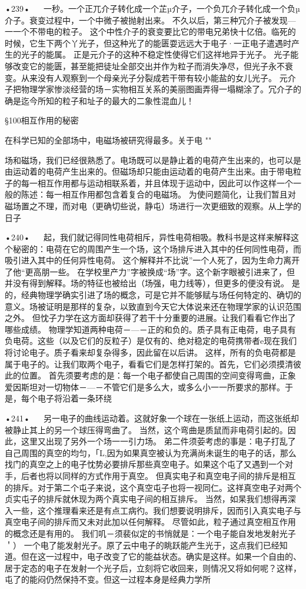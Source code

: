 •239•
  
一秒。一个正兀介子转化成一个芷µ介子，一个负兀介子转化成一个负µ介子。衰变过程中，一个中微子被抛射出来。
不久以后，第三种冗介子被发现—一一个不带电的粒子。
这个中性介子的衰变要比它的带电兄弟快十亿倍。临死的时候，它生下两个丫光子，但这种光了的能匮耍远远大于电子·一正电子遣遇时产生的光子的能属。
正是元介子的这种不稳定性使得它们这祥地异于光子。
光子能够改变它的能匮，甚至能把徒址全部交出并作为粒子而消失净尽，但光子永不衰变。从来没有人观察到一个母亲光子分裂成若干带有较小能盐的女儿光子。
元介子把物理学家惨淡经营的场－实物相互关系的美丽图画弄得一塌糊涂了。冗介子的确是迄今所知的粒子和址子的最大的二象性混血儿！

§100相互作用的秘密

在科学已知的全部场中，电磁场被研究得最多。关于电
""

场和磁场，我们已经很熟悉了。电场既可以是静止着的电荷产生出来的，也可以是由运动着的电荷产生出来的。但磁场却只能由运动着的电荷产生出来。由于带电粒子的每一相互作用都与运动相联系着，并且体现于运动中，因此可以作这样一个一般的陈述：每一相互作用都包含着复合的电磁场。
为使问题简化，让我们暂且对磁场置之不理，而对电（更确切些说，静屯）场进行一次更细致的观察。从上学的日子

•240•
  
起，我们就记得同性电荷相斥，异性电荷相吸。教科书是这样来解释这个秘密的：电荷在它的周围产生一个场，这个场排斥进入其中的任何同性电荷，而吸引进入其中的任何异性电荷。
这个解释并不比说”一个人死了，因为生命力离开了他“更高朋一些。
在学校里产力”字被换成“场”字。这个新字眼被引进来了，但并没有得到解释。场的特征也被给出（场强，电力线等），但更多的便没有说。
是的，经典物理学确实引进了场的概念，可是它并不能够赋与场任何特定的、确切的意义。场被证明是那样的复杂，以致直到今天它大体说来还在物理学家的认识范围之外。
但忱子力学在这方面却获得了若干十分重要的进展。让我们看看它作出了哪些成绩。
物理学知道两种电荷－—－正的和负的。质子具有正电荷，电子具有负电荷。这些（以及它们的反粒子）是仅有的、绝对稳定的电荷携带者e现在我们将讨论电子。质子看来却复杂得多，因此留在以后讲。
这样，所有的负电荷都是属于电子的。让我们取两个电子，看看它们是怎样打架的。首先，它们必须摸清彼此的位置。
首先须要考虑的是：每一个电子都使自己周围的空间变得弯曲，正象爱因斯坦对一切物体－—－不管它们是多么大，或多么小一一所要求的那样。于是，每个电子将沿着一条环绕

•241•
  
另一电子的曲线运动着。这就好象一个球在一张纸上运动，而这张纸却被静止其上的另一个球压得弯曲了。
当然，这个弯曲是质鼠而非电荷引起的。因此，这里又出现了另外一个场一一引力场。
弟二件须荌考虑的事是：电子打乱了自己周围的真空的均匀，「L,因为如果真空被认为充满尚未诞生的电子的话，那么找门的真空之上的电子忱势必要排斥那些真空电子。如果这个屯了又遇到一个对手，后者也将以同样的方式作用于真空。
但真实电子和真空电子间的排斥是相互的排斥。对于第二个屯子来说，这个真空屯子也将一视同仁。这祥真空电子对两个贞实屯子的排斥就休现为两个真实电子间的相互排斥。
当然，如杲我们想得再深入一些，这个推理看来还是有点工病彴。我们想要说明排斥，因而引入真实电子与真空电子间的排斥而又未对此加以任何解释。
尽管如此，粒子通过真空相互作用的概念还是有用的。
我们叽－须裴似定的书悄就是：一个电子能自发地发射光子＇）
一个电了能发射光子。原了云中电子的眺跃能产生光于，这点我们已经知道。但在这一过程中，电子改变了它的能益状态。确实是这样。如果一个自由的、居于定态的电子在发射一个光子后，立刻将它收回来，则情况又将如何呢？这样，屯了的能闷仍然保持不变。但这一过程本身是经典力学所

